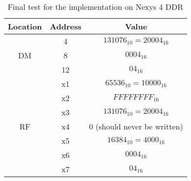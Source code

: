 \begin{table}[!ht]
    \begin{center}
        \begin{tabular}{|c|c|c|}
            \hline
            \textbf{Location} & \textbf{Address} & \textbf{Value}\\
            \hline
            \multirow{3}{*}{DM} & 4 & $131076_{10} = 20004_{16} $ \\
            & 8 & $0004_{16} $ \\
            & 12 & $04_{16} $ \\
            \hline
            \multirow{7}{*}{RF} & x1 & $65536_{10} = 10000_{16}$\\
            & x2 & $FFFFFFFF_{16}$\\
            & x3 & $131076_{10} = 20004_{16} $\\
            & x4 & 0 (should never be written)\\
            & x5 & $16384_{10} = 4000_{16} $\\
            & x6 & $0004_{16} $\\
            & x7 & $04_{16} $\\
            \hline
        \end{tabular}
    \caption{Final test for the implementation on Nexys 4 DDR}
    \label{table:test}
    \end{center}
\end{table}